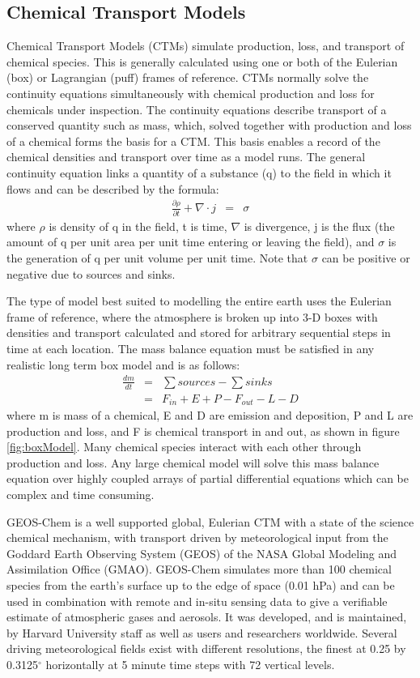\subsection{Chemical Transport Models}
Chemical Transport Models (CTMs) simulate production, loss, and transport of chemical species.
This is generally calculated using one or both of the Eulerian (box) or Lagrangian (puff) frames of reference.
CTMs normally solve the continuity equations simultaneously with chemical production and loss for chemicals under inspection. 
The continuity equations describe transport of a conserved quantity such as mass, which, solved together with production and loss of a chemical forms the basis for a CTM.
This basis enables a record of the chemical densities and transport over time as a model runs.
The general continuity equation links a quantity of a substance (q) to the field in which it flows and can be described by the formula:
\begin{eqnarray*}
    \frac{\partial \rho}{\partial t} + \nabla \cdot j &=& \sigma 
\end{eqnarray*}
where $\rho$ is density of q in the field, t is time, $\nabla$ is divergence, j is the flux (the amount of q per unit area per unit time entering or leaving the field), and $\sigma$ is the generation of q per unit volume per unit time.
Note that $\sigma$ can be positive or negative due to sources and sinks.

The type of model best suited to modelling the entire earth uses the Eulerian frame of reference, where the atmosphere is broken up into 3-D boxes with densities and transport calculated and stored for arbitrary sequential steps in time at each location.
The mass balance equation must be satisfied in any realistic long term box model and is as follows: 
\begin{eqnarray*}
    \frac{dm}{dt} &=& \sum{sources}-\sum{sinks} \\
    &=& F_{in} + E + P - F_{out} - L - D 
\end{eqnarray*}
where m is mass of a chemical, E and D are emission and deposition, P and L are production and loss, and F is chemical transport in and out, as shown in figure \ref{fig:boxModel}.
Many chemical species interact with each other through production and loss. 
Any large chemical model will solve this mass balance equation over highly coupled arrays of partial differential equations which can be complex and time consuming.

GEOS-Chem is a well supported global, Eulerian CTM with a state of the science chemical mechanism, with transport driven by meteorological input from the Goddard Earth Observing System (GEOS) of the NASA Global Modeling and Assimilation Office (GMAO).
GEOS-Chem simulates more than 100 chemical species from the earth's surface up to the edge of space (0.01 hPa) and can be used in combination with remote and in-situ sensing data to give a verifiable estimate of atmospheric gases and aerosols.
It was developed, and is maintained, by Harvard University staff as well as users and researchers worldwide. 
Several driving meteorological fields exist with different resolutions, the finest at 0.25 by 0.3125$^\circ$ horizontally at 5 minute time steps with 72 vertical levels.


